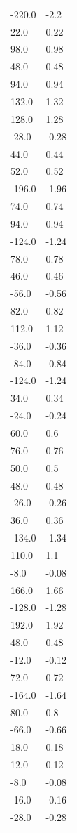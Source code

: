 \begin{longtable}{ll}
-220.0 & -2.2 \\
22.0 & 0.22 \\
98.0 & 0.98 \\
48.0 & 0.48 \\
94.0 & 0.94 \\
132.0 & 1.32 \\
128.0 & 1.28 \\
-28.0 & -0.28 \\
44.0 & 0.44 \\
52.0 & 0.52 \\
-196.0 & -1.96 \\
74.0 & 0.74 \\
94.0 & 0.94 \\
-124.0 & -1.24 \\
78.0 & 0.78 \\
46.0 & 0.46 \\
-56.0 & -0.56 \\
82.0 & 0.82 \\
112.0 & 1.12 \\
-36.0 & -0.36 \\
-84.0 & -0.84 \\
-124.0 & -1.24 \\
34.0 & 0.34 \\
-24.0 & -0.24 \\
60.0 & 0.6 \\
76.0 & 0.76 \\
50.0 & 0.5 \\
48.0 & 0.48 \\
-26.0 & -0.26 \\
36.0 & 0.36 \\
-134.0 & -1.34 \\
110.0 & 1.1 \\
-8.0 & -0.08 \\
166.0 & 1.66 \\
-128.0 & -1.28 \\
192.0 & 1.92 \\
48.0 & 0.48 \\
-12.0 & -0.12 \\
72.0 & 0.72 \\
-164.0 & -1.64 \\
80.0 & 0.8 \\
-66.0 & -0.66 \\
18.0 & 0.18 \\
12.0 & 0.12 \\
-8.0 & -0.08 \\
-16.0 & -0.16 \\
-28.0 & -0.28 \\

\end{longtable}
